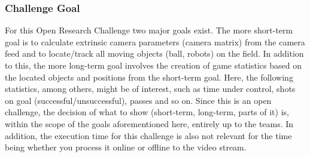     \subsubsection{Challenge Goal}
    For this Open Research Challenge two major goals exist. The more short-term goal is to calculate extrinsic camera parameters (camera matrix) from the camera feed and to locate/track all moving objects (ball, robots) on the field. In addition to this, the more long-term goal involves the creation of game statistics based on the located objects and positions from the short-term goal. Here, the following statistics, among others, might be of interest, such as time under control, shots on goal (successful/unsuccessful), passes and so on. Since this is an open challenge, the decision of what to show (short-term, long-term, parts of it) is, within the scope of the goals aforementioned here, entirely up to the teams. In addition, the execution time for this challenge is also not relevant for the time being whether you process it online or offline to the video stream.

